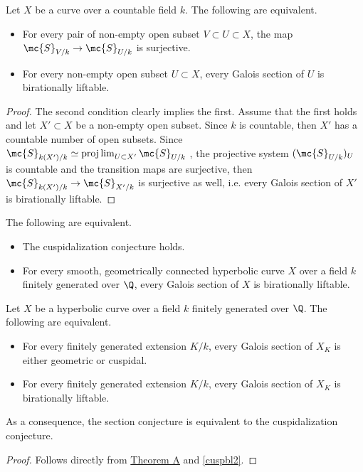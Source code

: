 
\begin{lemma}
\notready\label{cuspbl}
    Let $X$ be a curve over a countable field $k$. The following are equivalent.
    \begin{itemize}
        \item For every pair of non-empty open subset $V\subset U\subset X$, the map $\mc{S}_{V/k}\to\mc{S}_{U/k}$ is surjective.
        \item For every non-empty open subset $U\subset X$, every Galois section of $U$ is birationally liftable.
    \end{itemize}
\end{lemma}

\begin{proof}
    The second condition clearly implies the first. Assume that the first holds and let $X'\subset X$ be a non-empty open subset. Since $k$ is countable, then $X'$ has a countable number of open subsets. Since $\mc{S}_{k(X')/k}\simeq\projlim_{U\subset X'}\mc{S}_{U/k}$ \cite[Lemma 259]{sti13}, the projective system $(\mc{S}_{U/k})_{U}$ is countable and the transition maps are surjective, then $\mc{S}_{k(X')/k}\to\mc{S}_{X'/k}$ is surjective as well, i.e. every Galois section of $X'$ is birationally liftable.
\end{proof}

\begin{corollary}
\notready\label{cuspbl2}
    The following are equivalent.
    \begin{itemize}
        \item The cuspidalization conjecture holds.
        \item For every smooth, geometrically connected hyperbolic curve $X$ over a field $k$ finitely generated over $\Q$, every Galois section of $X$ is birationally liftable.
    \end{itemize}
\end{corollary}

\begin{TB}
\notready\label{cuspeq}
	Let $X$ be a hyperbolic curve over a field $k$ finitely generated over $\Q$. The following are equivalent.
	\begin{itemize}
		\item For every finitely generated extension $K/k$, every Galois section of $X_{K}$ is either geometric or cuspidal.
		\item For every finitely generated extension $K/k$, every Galois section of $X_{K}$ is birationally liftable.
	\end{itemize}
        As a consequence, the section conjecture is equivalent to the cuspidalization conjecture.

	\begin{proof}
		Follows directly from \hyperlink{TA}{Theorem A} and \autoref{cuspbl2}.
	\end{proof}
\end{TB}

